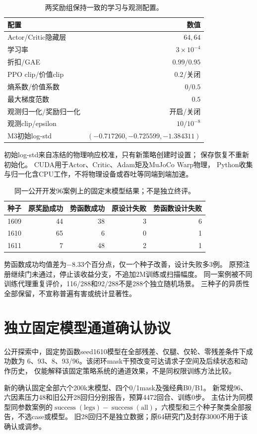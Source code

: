 \documentclass[UTF8,a4paper,11pt]{ctexart}
\begin{document}
\begin{table}[ht]
\centering
\caption{两奖励组保持一致的学习与观测配置。}
\begin{tabular}{lr}\toprule
配置 & 数值\\\midrule
Actor/Critic隐藏层 & $64,64$\\
学习率 & $3\times10^{-4}$\\
折扣/GAE & $0.99/0.95$\\
PPO clip/价值clip & $0.2$/关闭\\
熵系数/价值系数 & $0/0.5$\\
最大梯度范数 & $0.5$\\
观测归一化/奖励归一化 & 开启/关闭\\
观测clip/epsilon & $10/10^{-8}$\\
M3初始log-std & $(-0.717260,-0.725599,-1.384311)$\\\bottomrule
\end{tabular}
\end{table}
初始log-std来自冻结的物理响应校准，只有新策略创建时设置；
保存恢复不重新初始化。
CUDA用于Actor、Critic、Adam矩及MuJoCo Warp物理，
Python收集与归一化含CPU工作，不将物理设备或吞吐等同端到端加速。

\begin{table}[ht]
\centering
\caption{同一公开开发96案例上的固定末模型结果；不是独立终评。}
\begin{tabular}{lrrrr}\toprule
种子 & 原奖励成功 & 势函数成功 & 原设计失败 & 势函数设计失败\\\midrule
1609 &44&38&3&6\\
1610 &65&6&0&1\\
1611 &7&48&2&1\\\bottomrule
\end{tabular}
\end{table}
势函数成功均值差为$-8.33$个百分点，仅一个种子改善，设计失败多3例。
原预注册继续门未通过，停止该收益分支，不追加2M训练或扫描幅度。
同一案例被不同训练代理重复评价，116/288和92/288不是288个独立随机场景。
三种子的异质性全部保留，不宣称普遍有害或统计显著性。

\section{独立固定模型通道确认协议}
公开探索中，固定势函数seed1610模型在全部残差、仅腿、仅轮、零残差条件下成功数为
6、93、8、93/96。该闭环mask干预改变可达请求子空间及后续状态和动作历史，
仅能解释该固定策略系统的通道效果，不是同权限训练方法比较。

新的确认固定全部六个200k末模型、四个0/1mask及强经典B0/B1。
新常规96、六因素压力48和旧公开28回归分别报告，预算4472回合、训练0步。
主估计为同模型同参数案例的$\operatorname{success}(\text{legs})-
\operatorname{success}(\text{all})$，六模型和三个种子聚类全部报告，不选case或模型。
旧28回归不是独立数据；原64研究门及封存3000不用于该确认或调参。
\end{document}
